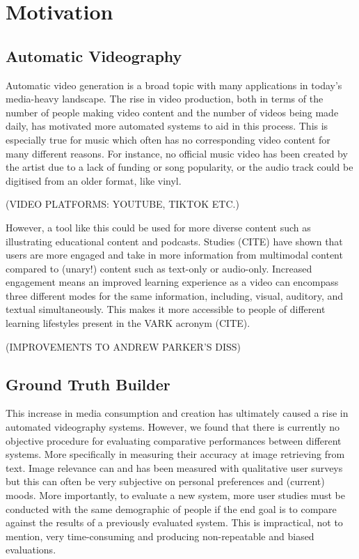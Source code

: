 \documentclass{l4proj}
\begin{document}
\section{Motivation}
\subsection{Automatic Videography}
Automatic video generation is a broad topic with many applications in today's media-heavy landscape. The rise in video production, both in terms of the number of people making video content and the number of videos being made daily, has motivated more automated systems to aid in this process. This is especially true for music which often has no corresponding video content for many different reasons. For instance, no official music video has been created by the artist due to a lack of funding or song popularity, or the audio track could be digitised from an older format, like vinyl. 

(VIDEO PLATFORMS: YOUTUBE, TIKTOK ETC.)

However, a tool like this could be used for more diverse content such as illustrating educational content and podcasts. Studies (CITE) have shown that users are more engaged and take in more information from multimodal content compared to (unary!) content such as text-only or audio-only. Increased engagement means an improved learning experience as a video can encompass three different modes for the same information, including, visual, auditory, and textual simultaneously. This makes it more accessible to people of different learning lifestyles present in the VARK acronym (CITE).

(IMPROVEMENTS TO ANDREW PARKER'S DISS)

\subsection{Ground Truth Builder}
This increase in media consumption and creation has ultimately caused a rise in automated videography systems. However, we found that there is currently no objective procedure for evaluating comparative performances between different systems. More specifically in measuring their accuracy at image retrieving from  text. Image relevance can and has been measured with qualitative user surveys but this can often be very subjective on personal preferences and (current) moods. More importantly, to evaluate a new system, more user studies must be conducted with the same demographic of people if the end goal is to compare against the results of a previously evaluated system. This is impractical, not to mention, very time-consuming and producing non-repeatable and biased evaluations.
\end{document}
